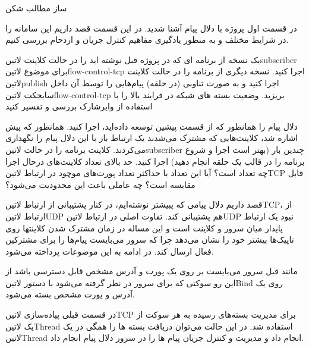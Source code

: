 \documentclass[]{article}
\begin{document}
  ‌ساز
  ‌مطالب
  ‌شکن


  در قسمت اول پروژه با دلال پیام آشنا شدید. در این قسمت قصد داریم این سامانه را در شرایط مختلف
  و به منظور یادگیری مفاهیم کنترل جریان و ازدحام بررسی کنیم.


   یک نسخه از برنامه ای که در پروژه قبل نوشته اید را در حالت کلاینت ‌لاتین{subscriber} برای موضوع ‌لاتین{flow-control-tcp} اجرا کنید.
   نسخه دیگری از برنامه را در حالت کلاینت ‌لاتین{publish} اجرا کنید و به صورت تناوبی (در حلقه) پیام‌هایی را توسط آن داخل سابجکت ‌لاتین{flow-control-tcp} بریزید.
   وضعیت بسته های شبکه در فرایند بالا را با استفاده از وایرشارک بررسی و تفسیر کنید


  دلال پیام را همانطور که از قسمت پیشین توسعه داده‌اید، اجرا کنید. همانطور که پیش اشاره شد، کلاینت‌هایی که مشترک می‌شدند
  یک ارتباط باز با این دلال پیام را نگهداری می‌کردند.
  کلاینت برنامه را در حالت ‌لاتین{subscriber} چندین بار (بهتر است اجرا و شروع برنامه را در قالب یک حلقه انجام دهید) اجرا کنید.
  حد بالای تعداد کلاینت‌های درحال اجرا چه تعداد است؟
  آیا این تعداد با حداکثر تعداد
  پورت‌های موچود در ارتباط ‌لاتین{TCP} قابل مقایسه است؟ چه عاملی باعث این محدودیت می‌شود؟


  قصد داریم دلال پیامی که پبیشتر نوشته‌ایم، در کنار پشتیبانی از ارتباط ‌لاتین{TCP}، از ارتباط ‌لاتین{UDP} هم پشتیبانی کند.
  تفاوت اصلی در ارتباط ‌لاتین{UDP} نبود یک ارتباط پایدار میان سرور و کلاینت است و این مساله در زمان مشترک شدن
  کلاینتها روی تاپیک‌ها بیشتر خود را نشان می‌دهد چرا که سرور می‌بایست پیام‌ها را برای مشترکین فعال ارسال کند.
  در ادامه به این موضوعات پرداخته می‌شود.



  مانند قبل سرور می‌بایست بر روی یک پورت و آدرس مشخص قابل دسترسی باشد از این رو سوکتی که برای سرور در نظر گرفته می‌شود
  با دستور ‌لاتین{Bind} روی یک آدرس و پورت مشخص بسته می‌شود.

  در قسمت قبلی پیاده‌سازی ‌لاتین{TCP} برای مدیریت بسته‌های رسیده به هر سوکت از یک ‌لاتین{Thread} استفاده شد.
  در این حالت می‌توان دریافت بسته ها را همگی در یک ‌لاتین{Thread} انجام داد و مدیریت و کنترل جریان پیام ها را در سرور دلال پیام انجام داد.
\end{document}

